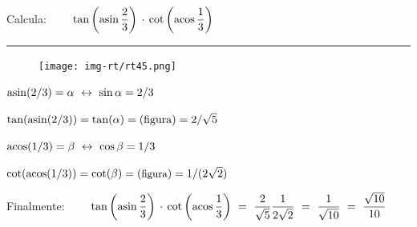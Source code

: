 \begin{miejercicio}

Calcula: $\qquad \tan \left( \asin \dfrac 2 3 \right) \, \cdot \, \cot \left( \acos \dfrac 1 3 \right)$

\rule{250pt}{0.1pt}

\begin{figure}[H]
	\centering
	\texttt{[image: img-rt/rt45.png]}
\end{figure}

\begin{multicols}{2}
\vspace{2mm} $\asin (2/3)=\alpha \ \leftrightarrow \ \sin \alpha=2/3$

\vspace{2mm} $\tan(\asin(2/3))=\tan(\alpha)=(\text{figura})=2/\sqrt{5}$

\vspace{2mm} $\acos(1/3)=\beta \ \leftrightarrow \ \cos \beta=1/3$

\vspace{2mm} $\small{\cot(\acos(1/3))=\cot(\beta)=(\text{figura})=1/(2\sqrt{2})}$
\end{multicols}

Finalmente: $\qquad \tan \left( \asin \dfrac 2 3 \right) \, \cdot \, \cot \left( \acos \dfrac 1 3 \right) \ = \ \dfrac {2} {\sqrt{5}} \dfrac{1}{2\sqrt{2}}\ = \  \dfrac {1}{\sqrt{10}}\ = \ \dfrac{\sqrt{10}}{10}$
	
\end{miejercicio}

\vspace{5mm}

